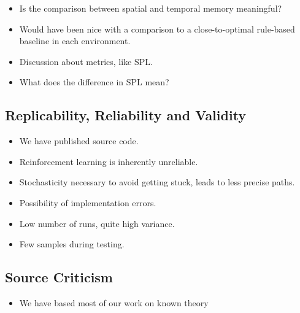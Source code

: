 \begin{itemize}
    \item Is the comparison between spatial and temporal memory meaningful?
    \item Would have been nice with a comparison to a close-to-optimal rule-based baseline in each environment.
    \item Discussion about metrics, like SPL.
    \item What does the difference in SPL mean?
\end{itemize}


\subsection{Replicability, Reliability and Validity}

\begin{itemize}
    \item We have published source code.
    \item Reinforcement learning is inherently unreliable.
    \item Stochasticity necessary to avoid getting stuck, leads to less precise paths.
    \item Possibility of implementation errors.
    \item Low number of runs, quite high variance.
    \item Few samples during testing.
\end{itemize}

\subsection{Source Criticism}

\begin{itemize}
    \item We have based most of our work on known theory
\end{itemize}

